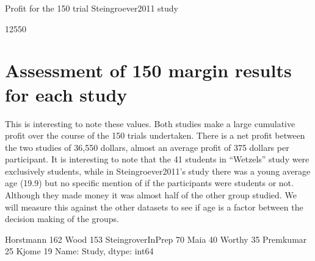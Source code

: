 \documentclass[letterpaper,10pt,english]{jupyterBook}
\begin{document}
\begin{sphinxVerbatim}[commandchars=\\\{\}]
Profit for the 150 trial Steingroever2011 study
\end{sphinxVerbatim}

\begin{sphinxVerbatim}[commandchars=\\\{\}]
12550
\end{sphinxVerbatim}


\section{Assessment of 150 margin results for each study}
\label{\detokenize{data-analysis:assessment-of-150-margin-results-for-each-study}}
\sphinxAtStartPar
This is interesting to note these values. Both studies make a large cumulative profit over the course of the 150 trials undertaken. There is a net profit between the two studies of 36,550 dollars, almost an average profit of 375 dollars per participant. It is interesting to note that the 41 students in “Wetzels” study were exclusively students, while in Steingroever2011’s study there was a young average age (19.9) but no specific mention of if the participants were students or not. Although they made money it was almost half of the other group studied. We will measure this against the other datasets to see if age is a factor between the decision making of the groups.

\begin{sphinxVerbatim}[commandchars=\\\{\}]
\PYG{p}{[}\PYG{p}{]}
\end{sphinxVerbatim}

\begin{sphinxVerbatim}[commandchars=\\\{\}]
Horstmann            162
Wood                 153
SteingroverInPrep     70
Maia                  40
Worthy                35
Premkumar             25
Kjome                 19
Name: Study, dtype: int64
\end{sphinxVerbatim}

\begin{sphinxVerbatim}[commandchars=\\\{\}]
\PYG{p}{[}\PYG{p}{[}\PYG{p}{]}   \PYG{p}{]}
\end{sphinxVerbatim}
\end{document}
